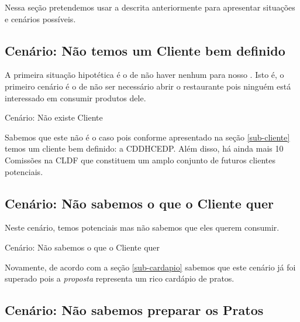 Nessa seção pretendemos usar a \METAFORADORESTAURANTE \xspace descrita anteriormente para apresentar situações e cenários possíveis. 


\subsection{Cenário: Não temos um Cliente bem definido}    



    A primeira situação hipotética é o de não haver nenhum \CLIENTE \xspace para nosso \RESTAURANTE. Isto é, o primeiro cenário é o de não ser necessário abrir o restaurante pois ninguém está interessado em consumir produtos dele.
    
    \begin{env-cenario}{Cenário: Não existe Cliente}
            \mschecknao \xspace \CLIENTE 
    \end{env-cenario}
    
    Sabemos que este não é o caso pois conforme apresentado na seção \ref{sub-cliente} temos um cliente bem definido: a CDDHCEDP. Além disso, há ainda mais 10 Comissões na CLDF que constituem um amplo conjunto de futuros clientes potenciais.
    
\subsection{Cenário: Não sabemos o que o Cliente quer}    
    
    Neste cenário, temos \CLIENTES \xspace potenciais mas não sabemos que \PRATOS \xspace eles querem consumir.
    
    \begin{env-cenario}{Cenário: Não sabemos o que o Cliente quer}
            \mschecksim \xspace \CLIENTE  
            
            \mschecknao \xspace \CARDAPIO
    \end{env-cenario}

    Novamente, de acordo com a seção \ref{sub-cardapio} sabemos que este cenário já foi superado pois a \emph{proposta} representa um rico cardápio de pratos.

\subsection{Cenário: Não sabemos preparar os Pratos}    
    
